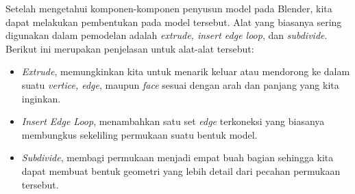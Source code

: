 Setelah mengetahui komponen-komponen penyusun model pada Blender, kita dapat melakukan pembentukan pada model tersebut. Alat yang biasanya sering digunakan dalam pemodelan adalah {\it extrude, insert edge loop}, dan {\it  subdivide}. Berikut ini merupakan penjelasan untuk alat-alat tersebut:
\begin{itemize}
	\item {\it Extrude}, memungkinkan kita untuk menarik keluar atau mendorong ke dalam suatu {\it vertice, edge}, maupun {\it face} sesuai dengan arah dan panjang yang kita inginkan.
	\item {\it Insert Edge Loop}, menambahkan satu set {\it edge} terkoneksi yang biasanya membungkus sekeliling permukaan suatu bentuk model. 
	\item {\it Subdivide}, membagi permukaan menjadi empat buah bagian sehingga kita dapat membuat bentuk geometri yang lebih detail dari pecahan permukaan tersebut.
\end{itemize}



























